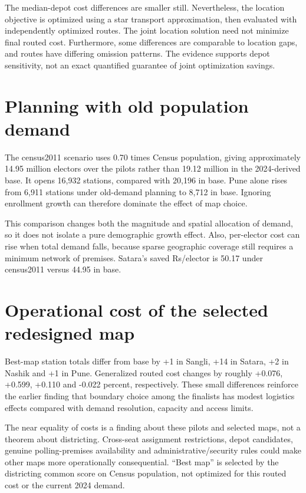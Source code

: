 \documentclass[11pt,a4paper,oneside]{report}
\newcommand{\source}[1]{\par\nopagebreak[4]{\footnotesize\color{teal}Evidence: #1.}\par}
\begin{document}
The median-depot cost differences are smaller still. Nevertheless, the location objective is optimized using a star transport approximation, then evaluated with independently optimized routes. The joint location solution need not minimize final routed cost. Furthermore, some differences are comparable to location gaps, and routes have differing omission patterns. The evidence supports depot sensitivity, not an exact quantified guarantee of joint optimization savings.
\source{[S8]--[S10]}

\section{Planning with old population demand}
The census2011 scenario uses 0.70 times Census population, giving approximately 14.95 million electors over the pilots rather than 19.12 million in the 2024-derived base. It opens 16,932 stations, compared with 20,196 in base. Pune alone rises from 6,911 stations under old-demand planning to 8,712 in base. Ignoring enrollment growth can therefore dominate the effect of map choice.

This comparison changes both the magnitude and spatial allocation of demand, so it does not isolate a pure demographic growth effect. Also, per-elector cost can rise when total demand falls, because sparse geographic coverage still requires a minimum network of premises. Satara's saved Rs/elector is 50.17 under census2011 versus 44.95 in base.
\source{[S7], [S9]}

\section{Operational cost of the selected redesigned map}
Best-map station totals differ from base by +1 in Sangli, +14 in Satara, +2 in Nashik and +1 in Pune. Generalized routed cost changes by roughly +0.076, +0.599, +0.110 and -0.022 percent, respectively. These small differences reinforce the earlier finding that boundary choice among the finalists has modest logistics effects compared with demand resolution, capacity and access limits.

The near equality of costs is a finding about these pilots and selected maps, not a theorem about districting. Cross-seat assignment restrictions, depot candidates, genuine polling-premises availability and administrative/security rules could make other maps more operationally consequential. ``Best map'' is selected by the districting common score on Census population, not optimized for this routed cost or the current 2024 demand.
\source{[S5], [S9]}
\end{document}
